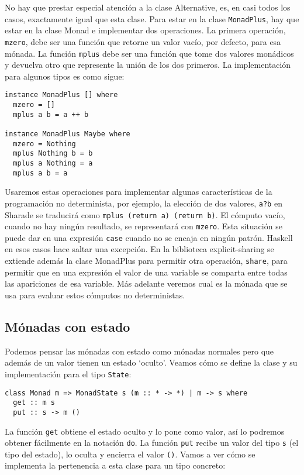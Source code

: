 \documentclass[class=article, crop=false]{standalone}
\begin{document}
No hay que prestar especial atención a la clase Alternative, es, en casi todos los casos,
exactamente igual que esta clase. Para estar en la clase \verb`MonadPlus`, hay que estar en
la clase Monad e implementar dos operaciones. La primera operación, \verb`mzero`, debe ser
una función que retorne un valor vacío, por defecto, para esa mónada. La función \verb`mplus`
debe ser una función que tome dos valores monádicos y devuelva otro que represente la unión
de los dos primeros. La implementación para algunos tipos es como sigue:

\begin{verbatim}
instance MonadPlus [] where
  mzero = []
  mplus a b = a ++ b

instance MonadPlus Maybe where
  mzero = Nothing
  mplus Nothing b = b
  mplus a Nothing = a
  mplus a b = a
\end{verbatim}

Usaremos estas operaciones para implementar algunas características de la programación no
determinista, por ejemplo, la elección de dos valores, \verb`a?b` en Sharade se traducirá
como \verb`mplus (return a) (return b)`. El cómputo vacío, cuando no hay ningún resultado,
se representará con \verb`mzero`. Esta situación se puede dar en una expresión \verb`case`
cuando no se encaja en ningún patrón. Haskell en esos casos hace saltar una excepción. En la
biblioteca explicit-sharing se extiende además la clase MonadPlus para permitir otra
operación, \verb`share`, para permitir que en una expresión el valor de una variable se
comparta entre todas las apariciones de esa variable. Más adelante veremos cual es la mónada
que se usa para evaluar estos cómputos no deterministas.

\subsection{Mónadas con estado}
Podemos pensar las mónadas con estado como mónadas normales pero que además de un valor
tienen un estado `oculto'. Veamos cómo se define la clase y su implementación para el tipo
\verb`State`:

\begin{verbatim}
class Monad m => MonadState s (m :: * -> *) | m -> s where
  get :: m s
  put :: s -> m ()
\end{verbatim}

La función \verb`get` obtiene el estado oculto y lo pone como valor, así lo podremos
obtener fácilmente en la notación \verb`do`. La función \verb`put` recibe un valor del tipo
\verb`s` (el tipo del estado), lo oculta y encierra el valor \verb`()`. Vamos a ver cómo se
implementa la pertenencia a esta clase para un tipo concreto:
\end{document}
